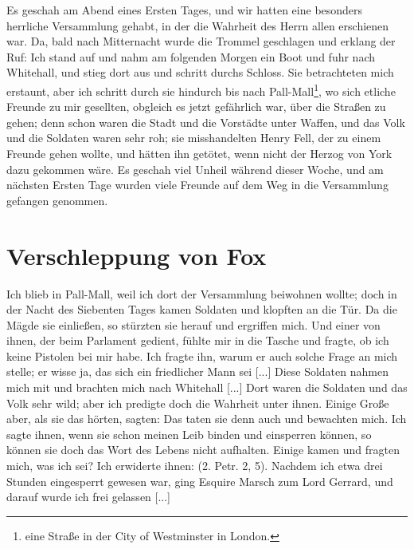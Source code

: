Es geschah am Abend eines Ersten Tages, und wir hatten eine
besonders herrliche Versammlung gehabt, in der die Wahrheit
des Herrn allen erschienen war. Da, bald nach Mitternacht wurde
die Trommel geschlagen und erklang der Ruf:  Ich stand auf und nahm am folgenden Morgen
ein Boot und fuhr nach Whitehall, und stieg 
dort aus und schritt
durchs Schloss. Sie betrachteten mich erstaunt, aber ich schritt
durch sie hindurch bis nach Pall-Mall\footnote{eine Straße in der 
City of Westminster in London.}, wo sich etliche Freunde
zu mir gesellten, obgleich es jetzt gefährlich war, über die Straßen
zu gehen; denn schon waren die Stadt und die Vorstädte unter
Waffen, und das Volk und die Soldaten waren sehr roh; sie 
misshandelten Henry Fell, der zu einem 
Freunde gehen wollte, und
hätten ihn getötet, wenn nicht der Herzog von 
York dazu gekommen
wäre. Es geschah viel Unheil während dieser Woche, und am
nächsten Ersten Tage wurden viele Freunde auf dem Weg in die
Versammlung gefangen genommen.

\section{Verschleppung von Fox}

Ich blieb in Pall-Mall, weil ich dort der Versammlung beiwohnen 
wollte; doch in der Nacht des Siebenten Tages kamen
Soldaten und klopften an die Tür. Da die Mägde sie einließen,
so stürzten sie herauf und ergriffen mich. Und einer von ihnen,
der beim Parlament gedient, fühlte mir in die Tasche und fragte,
ob ich keine Pistolen bei mir habe. Ich fragte ihn, warum er
auch solche Frage an mich stelle; er wisse ja, das sich ein 
friedlicher Mann sei [...] Diese Soldaten nahmen mich mit und
brachten mich nach Whitehall [...] Dort waren die Soldaten
und das Volk sehr wild; aber ich predigte doch die Wahrheit
unter ihnen. Einige Große aber, als sie das hörten, sagten:
 Das taten sie denn auch
und bewachten mich. Ich sagte ihnen, wenn sie schon meinen
Leib binden und einsperren können, so können sie doch das Wort
des Lebens nicht aufhalten. Einige kamen und fragten mich,
was ich sei? Ich erwiderte ihnen:  (2. Petr. 2, 5). 
Nachdem ich etwa drei 
Stunden eingesperrt gewesen war, ging Esquire Marsch zum Lord 
Gerrard, und darauf wurde ich frei gelassen [...]


